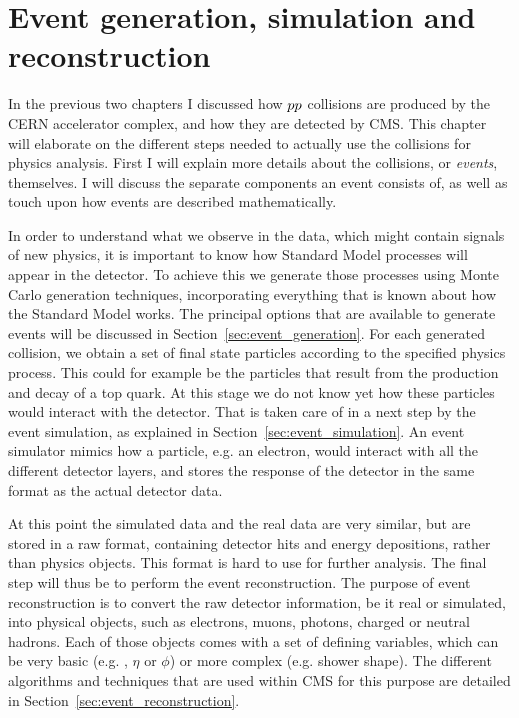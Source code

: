 \chapter[Event generation, simulation, reconstruction]{Event generation, simulation and
reconstruction \label{chap:event_generation}}

In the previous two chapters I discussed how ${p}{p}$ collisions are produced by the CERN
accelerator complex, and how they are detected by CMS. This chapter will elaborate on the different
steps needed to actually use the collisions for physics analysis. 
First I will explain more details about the collisions, or \textit{events}, themselves. I will
discuss the separate components an event consists of, as well as touch upon how events are described
mathematically. 

In order to understand what we observe in the data, which might contain signals of new physics, it
is important to know how Standard Model processes will appear in the detector. To achieve this we
generate those processes using Monte Carlo generation techniques, incorporating everything that is
known about how the Standard Model works. The principal options that are available to generate
events will be discussed in Section~\ref{sec:event_generation}. 
For each generated collision, we obtain a set of final state particles according to the specified
physics process. This could for example be the particles that result from the production and decay
of a top quark. 
At this stage we do not know yet how these particles would interact with the detector. That is
taken care of in a next step by the event simulation, as explained in
Section~\ref{sec:event_simulation}. An event simulator mimics how a particle, e.g. an electron,
would interact with all the different detector layers, and stores the response of the detector in
the same format as the actual detector data. 

At this point the simulated data and the real data are very similar, but are stored in a raw format,
containing detector hits and energy depositions, rather than physics objects. This format is hard to
use for further analysis. The final step will thus be to perform the event reconstruction. The
purpose of event reconstruction is to convert the raw detector information, be it real or simulated,
into physical objects, such as electrons, muons, photons, charged or neutral hadrons. Each of those
objects comes with a set of defining variables, which can be very basic (e.g. \pt, $\eta$ or $\phi$)
or more complex (e.g. shower shape). The different algorithms and techniques that are used within
CMS for this purpose are detailed in Section~\ref{sec:event_reconstruction}. 

